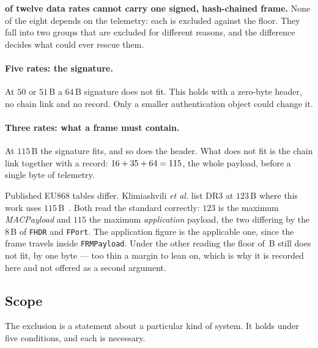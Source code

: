 \textbf{\exclCountCap{} of twelve data rates cannot carry one signed, hash-chained frame.} None
of the eight depends on the telemetry: each is excluded against the floor. They fall into two
groups that are excluded for different reasons, and the difference decides what could ever
rescue them.

\paragraph{Five rates: the signature.} At $50$ or $51$\,B a $64$\,B signature does not fit. This
holds with a zero-byte header, no chain link and no record. Only a smaller authentication object
could change it.

\paragraph{Three rates: what a frame must contain.} At $115$\,B the signature fits, and so does
the header. What does not fit is the chain link together with a record:
$16 + 35 + 64 = 115$, the whole payload, before a single byte of
telemetry.

\begin{remark}
Published EU868 tables differ. Klimiashvili \emph{et al.} list DR3 at $123$\,B where this work
uses $115$\,B~\cite{klimiashvili2020loravswifi}. Both read the standard correctly: $123$ is the
maximum \emph{MACPayload} and $115$ the maximum \emph{application} payload, the two differing by
the $8$\,B of \texttt{FHDR} and \texttt{FPort}. The application figure is the applicable one, since
the frame travels inside \texttt{FRMPayload}. Under the other reading the floor of \exFloor\,B
still does not fit, by one byte --- too thin a margin to lean on, which is why it is recorded here
and not offered as a second argument.
\end{remark}

\subsection{Scope}

The exclusion is a statement about a particular kind of system. It holds under five conditions,
and each is necessary.

